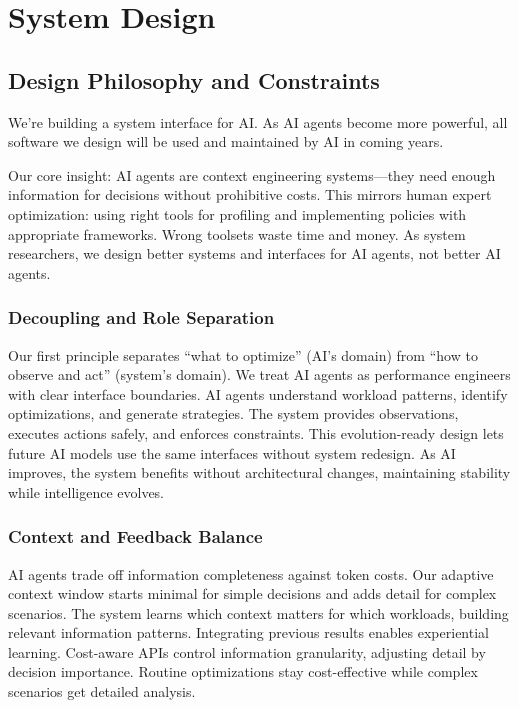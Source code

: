 \section{System Design}

\subsection{Design Philosophy and Constraints}

We're building a system interface for AI. As AI agents become more powerful, all software we design will be used and maintained by AI in coming years.

Our core insight: AI agents are context engineering systems—they need enough information for decisions without prohibitive costs. This mirrors human expert optimization: using right tools for profiling and implementing policies with appropriate frameworks. Wrong toolsets waste time and money. As system researchers, we design better systems and interfaces for AI agents, not better AI agents.

\subsubsection{Decoupling and Role Separation}
Our first principle separates ``what to optimize'' (AI's domain) from ``how to observe and act'' (system's domain). We treat AI agents as performance engineers with clear interface boundaries. AI agents understand workload patterns, identify optimizations, and generate strategies. The system provides observations, executes actions safely, and enforces constraints. This evolution-ready design lets future AI models use the same interfaces without system redesign. As AI improves, the system benefits without architectural changes, maintaining stability while intelligence evolves.

\subsubsection{Context and Feedback Balance}
AI agents trade off information completeness against token costs. Our adaptive context window starts minimal for simple decisions and adds detail for complex scenarios. The system learns which context matters for which workloads, building relevant information patterns. Integrating previous results enables experiential learning. Cost-aware APIs control information granularity, adjusting detail by decision importance. Routine optimizations stay cost-effective while complex scenarios get detailed analysis.

